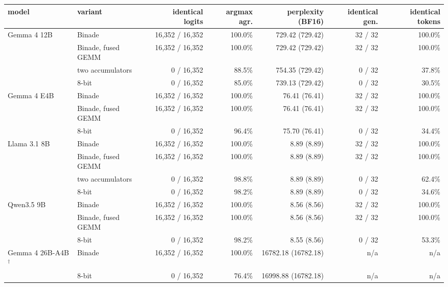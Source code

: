 \begin{tabular}{llrrrrr}
\toprule
model & variant & identical logits & argmax agr. & perplexity (BF16) & identical gen. & identical tokens \\
\midrule
Gemma 4 12B & Binade & 16,352 / 16,352 & 100.0\% & 729.42 (729.42) & 32 / 32 & 100.0\% \\
 & Binade, fused GEMM & 16,352 / 16,352 & 100.0\% & 729.42 (729.42) & 32 / 32 & 100.0\% \\
 & two accumulators & 0 / 16,352 & 88.5\% & 754.35 (729.42) & 0 / 32 & 37.8\% \\
 & 8-bit & 0 / 16,352 & 85.0\% & 739.13 (729.42) & 0 / 32 & 30.5\% \\
Gemma 4 E4B & Binade & 16,352 / 16,352 & 100.0\% & 76.41 (76.41) & 32 / 32 & 100.0\% \\
 & Binade, fused GEMM & 16,352 / 16,352 & 100.0\% & 76.41 (76.41) & 32 / 32 & 100.0\% \\
 & 8-bit & 0 / 16,352 & 96.4\% & 75.70 (76.41) & 0 / 32 & 34.4\% \\
Llama 3.1 8B & Binade & 16,352 / 16,352 & 100.0\% & 8.89 (8.89) & 32 / 32 & 100.0\% \\
 & Binade, fused GEMM & 16,352 / 16,352 & 100.0\% & 8.89 (8.89) & 32 / 32 & 100.0\% \\
 & two accumulators & 0 / 16,352 & 98.8\% & 8.89 (8.89) & 0 / 32 & 62.4\% \\
 & 8-bit & 0 / 16,352 & 98.2\% & 8.89 (8.89) & 0 / 32 & 34.6\% \\
Qwen3.5 9B & Binade & 16,352 / 16,352 & 100.0\% & 8.56 (8.56) & 32 / 32 & 100.0\% \\
 & Binade, fused GEMM & 16,352 / 16,352 & 100.0\% & 8.56 (8.56) & 32 / 32 & 100.0\% \\
 & 8-bit & 0 / 16,352 & 98.2\% & 8.55 (8.56) & 0 / 32 & 53.3\% \\
Gemma 4 26B-A4B$^\dagger$ & Binade & 16,352 / 16,352 & 100.0\% & 16782.18 (16782.18) & n/a & n/a \\
 & 8-bit & 0 / 16,352 & 76.4\% & 16998.88 (16782.18) & n/a & n/a \\
\bottomrule
\end{tabular}
